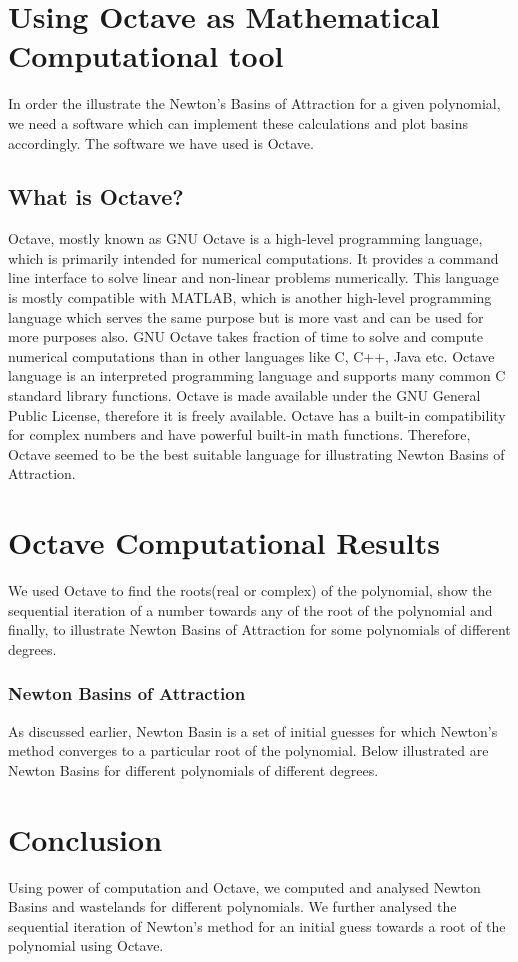 \documentclass[15pt]{report}
\begin{document}
\section*{Using Octave as Mathematical Computational tool}
In order the illustrate the Newton's Basins of Attraction for a given polynomial, we need a software which can implement these calculations and plot basins accordingly. The software we have used is Octave.\\
\subsection*{What is Octave?}
Octave, mostly known as GNU Octave is a high-level programming language, which is primarily intended for numerical computations. It provides a command line interface to solve linear and non-linear problems numerically. This language is mostly compatible with MATLAB, which is another high-level programming language which serves the same purpose but is more vast and can be used for more purposes also. GNU Octave takes fraction of time to solve and compute numerical computations than in other languages like C, C++, Java etc. Octave language is an interpreted programming language and supports many common C standard library functions. Octave is made available under the GNU General Public License, therefore it is freely available. Octave has a built-in compatibility for complex numbers  and have powerful built-in math functions. Therefore, Octave seemed to be the best suitable language for illustrating Newton Basins of Attraction.
\newpage
\section*{Octave Computational Results}
We used Octave to find the roots(real or complex) of the polynomial, show the sequential iteration of a number towards any of the root of the polynomial and finally, to illustrate Newton Basins of Attraction for some polynomials of different degrees.\\
\subsubsection*{Newton Basins of Attraction}
As discussed earlier, Newton Basin is a set of initial guesses for which Newton's method converges to a particular root of the polynomial. Below illustrated are Newton Basins for different polynomials of different degrees.   
\newpage
\section*{Conclusion}
Using power of computation and Octave, we computed and analysed Newton Basins and wastelands for different polynomials. We further analysed the sequential iteration of Newton's method for an initial guess towards a root of the polynomial using Octave.
\newpage
\end{document}
